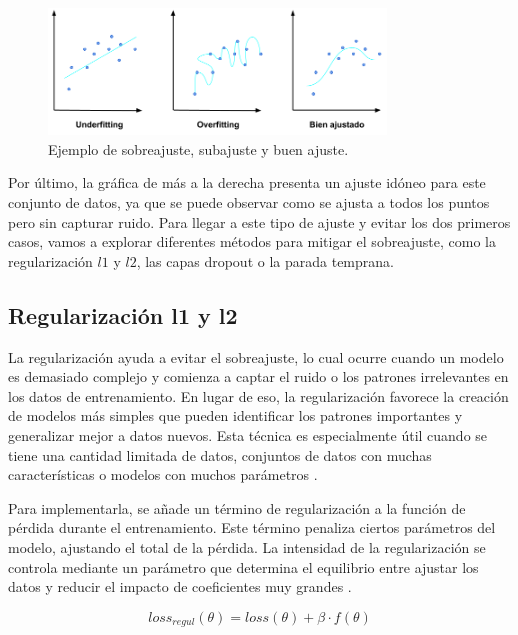 \begin{figure}[h!]
    \centering
    \includegraphics[width=0.8\textwidth]{img/overfitting.png}
    \caption{Ejemplo de sobreajuste, subajuste y buen ajuste.}
    \label{fig:overfitting}
\end{figure}

Por último, la gráfica de más a la derecha presenta un ajuste idóneo para este conjunto de datos, ya que se puede observar como se ajusta a todos los puntos pero sin capturar ruido. Para llegar a este tipo de ajuste y evitar los dos primeros casos, vamos a explorar diferentes métodos para mitigar el sobreajuste, como la regularización $l1$ y $l2$, las capas dropout o la parada temprana.

\subsection{Regularización l1 y l2} \label{sec:regularizacion}

La regularización ayuda a evitar el sobreajuste, lo cual ocurre cuando un modelo es demasiado complejo y comienza a captar el ruido o los patrones irrelevantes en los datos de entrenamiento. En lugar de eso, la regularización favorece la creación de modelos más simples que pueden identificar los patrones importantes y generalizar mejor a datos nuevos. Esta técnica es especialmente útil cuando se tiene una cantidad limitada de datos, conjuntos de datos con muchas características o modelos con muchos parámetros \citep{pajares2021aprendizaje}.

Para implementarla, se añade un término de regularización a la función de pérdida durante el entrenamiento. Este término penaliza ciertos parámetros del modelo, ajustando el total de la pérdida. La intensidad de la regularización se controla mediante un parámetro que determina el equilibrio entre ajustar los datos y reducir el impacto de coeficientes muy grandes \citep{geron2022hands}.

\begin{equation}
loss_{regul}(\theta) = loss(\theta) + \beta \cdot f(\theta) 
\end{equation}

